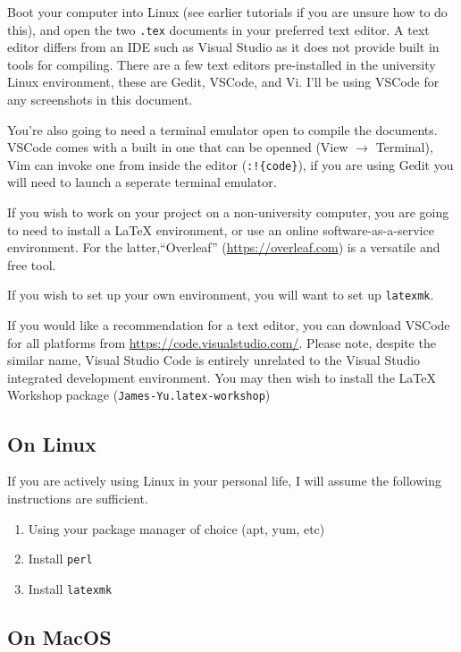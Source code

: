 Boot your computer into Linux (see earlier tutorials if you are unsure how to do this), and open the two \verb|.tex| documents in your preferred text editor. A text editor differs from an IDE such as Visual Studio as it does not provide built in tools for compiling. There are a few text editors pre-installed in the university Linux environment, these are Gedit, VSCode, and Vi. I'll be using VSCode for any screenshots in this document.

You're also going to need a terminal emulator open to compile the documents. VSCode comes with a built in one that can be openned (View $\rightarrow$ Terminal), Vim can invoke one from inside the editor (\verb|:!{code}|), if you are using Gedit you will need to launch a seperate terminal emulator.

If you wish to work on your project on a non-university computer, you are going to need to install a \LaTeX{} environment, or use an online software-as-a-service environment.
For the latter,``Overleaf'' (\url{https://overleaf.com}) is a versatile and free tool.

If you wish to set up your own environment, you will want to set up \verb|latexmk|.

If you would like a recommendation for a text editor, you can download VSCode for all platforms from \url{https://code.visualstudio.com/}. Please note, despite the similar name, Visual Studio Code is entirely unrelated to the Visual Studio integrated development environment. You may then wish to install the \LaTeX{} Workshop package (\verb|James-Yu.latex-workshop|)

\subsection*{On Linux}

If you are actively using Linux in your personal life, I will assume the following instructions are sufficient.

\begin{enumerate}
    \item[] Using your package manager of choice (apt, yum, etc)
    \item Install \verb|perl|
    \item Install \verb|latexmk|
\end{enumerate}

\subsection*{On MacOS}

